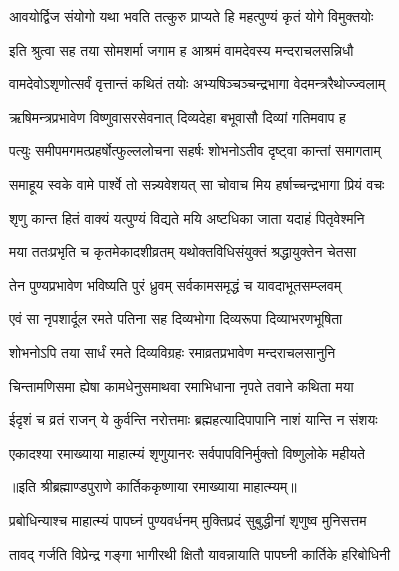 \twolineshloka
{आवयोर्द्विज संयोगो यथा भवति तत्कुरु}
{प्राप्यते हि महत्पुण्यं कृतं योगे विमुक्तयोः} %

\twolineshloka
{इति श्रुत्वा सह तया सोमशर्मा जगाम ह}
{आश्रमं वामदेवस्य मन्दराचलसन्निधौ} %

\twolineshloka
{वामदेवोऽशृणोत्सर्वं वृत्तान्तं कथितं तयोः}
{अभ्यषिञ्चञ्चन्द्रभागा वेदमन्त्ररैथोज्ज्वलाम्} %

\twolineshloka
{ऋषिमन्त्रप्रभावेण विष्णुवासरसेवनात्}
{दिव्यदेहा बभूवासौ दिव्यां गतिमवाप ह} %

\twolineshloka
{पत्युः समीपमगमत्प्रहर्षोत्फुल्ललोचना}
{सहर्षः शोभनोऽतीव दृष्ट्वा कान्तां समागताम्} %

\twolineshloka
{समाहूय स्वके वामे पार्श्वे तो सन्न्यवेशयत्}
{सा चोवाच मिय हर्षाच्चन्द्रभागा प्रियं वचः} %

\twolineshloka
{शृणु कान्त हितं वाक्यं यत्पुण्यं विद्यते मयि}
{अष्टधिका जाता यदाहं पितृवेश्मनि} %

\twolineshloka
{मया ततःप्रभृति च कृतमेकादशीव्रतम्}
{यथोक्तविधिसंयुक्तं श्रद्धायुक्तेन चेतसा} %

\twolineshloka
{तेन पुण्यप्रभावेण भविष्यति पुरं ध्रुवम्}
{सर्वकामसमृद्धं च यावदाभूतसम्प्लवम्} %

\twolineshloka
{एवं सा नृपशार्दूल रमते पतिना सह}
{दिव्यभोगा दिव्यरूपा दिव्याभरणभूषिता} %

\twolineshloka
{शोभनोऽपि तया सार्धं रमते दिव्यविग्रहः}
{रमाव्रतप्रभावेण मन्दराचलसानुनि} %

\twolineshloka
{चिन्तामणिसमा ह्येषा कामधेनुसमाथवा}
{रमाभिधाना नृपते तवाने कथिता मया} %

\twolineshloka
{ईदृशं च व्रतं राजन् ये कुर्वन्ति नरोत्तमाः}
{ब्रह्महत्यादिपापानि नाशं यान्ति न संशयः} %

\twolineshloka
{एकादश्या रमाख्याया माहात्म्यं शृणुयानरः}
{सर्वपापविनिर्मुक्तो विष्णुलोके महीयते} %

॥इति श्रीब्रह्माण्डपुराणे कार्तिककृष्णाया रमाख्याया माहात्म्यम्॥


\hyperref[sec:ekadashi_mahatmyam_vrata_raja]{\closesub}
\clearpage

\label{sec:vrata-raja-karttika-shukla-prabodhini}


\twolineshloka
{प्रबोधिन्याश्च माहात्म्यं पापघ्नं पुण्यवर्धनम्}
{मुक्तिप्रदं सुबुद्धीनां शृणुष्व मुनिसत्तम} %

\twolineshloka
{तावद् गर्जति विप्रेन्द्र गङ्गा भागीरथी क्षितौ}
{यावन्नायाति पापघ्नी कार्तिके हरिबोधिनी} %

